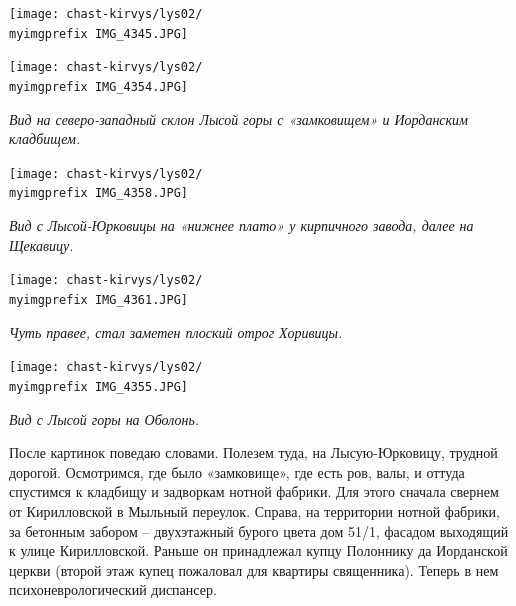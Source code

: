 \newpage





\begin{center}
\texttt{[image: chast-kirvys/lys02/\\myimgprefix IMG\_4345.JPG]}
\end{center}

\begin{center}
\texttt{[image: chast-kirvys/lys02/\\myimgprefix IMG\_4354.JPG]}

\textit{Вид на северо-западный склон Лысой горы с «замковищем» и Иорданским кладбищем.}
\end{center}

\newpage

\begin{center}
\texttt{[image: chast-kirvys/lys02/\\myimgprefix IMG\_4358.JPG]}

\textit{Вид с Лысой-Юрковицы на «нижнее плато» у кирпичного завода, далее на Щекавицу.}
\end{center}


\begin{center}
\texttt{[image: chast-kirvys/lys02/\\myimgprefix IMG\_4361.JPG]}

\textit{Чуть правее, стал заметен плоский отрог Хоривицы.}
\end{center}

\newpage

\begin{center}
\texttt{[image: chast-kirvys/lys02/\\myimgprefix IMG\_4355.JPG]}

\textit{Вид с Лысой горы на Оболонь.}
\end{center}

После картинок поведаю словами. Полезем туда, на Лысую-Юрковицу, трудной дорогой. Осмотримся, где было «замковище», где есть ров, валы, и оттуда спустимся к кладбищу и задворкам нотной фабрики. Для этого сначала свернем от Кирилловской в Мыльный переулок. Справа, на территории нотной фабрики, за бетонным забором – двухэтажный бурого цвета дом 51/1, фасадом выходящий к улице Кирилловской. Раньше он принадлежал купцу Полоннику да Иорданской церкви (второй этаж купец пожаловал для квартиры священника). Теперь в нем психоневрологический диспансер.

